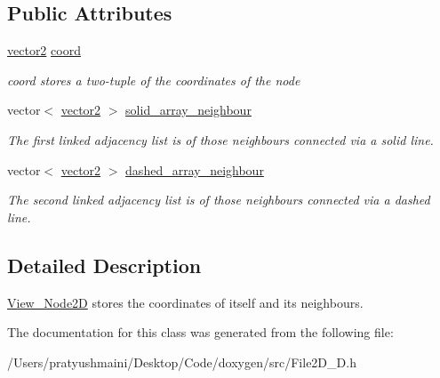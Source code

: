 \subsection*{Public Attributes}
\begin{DoxyCompactItemize}
\item 
\mbox{\label{class_view___node2_d_ac09ef534cd026bc7b0964b3d46674bed}} 
\mbox{\hyperlink{classvector2}{vector2}} \mbox{\hyperlink{class_view___node2_d_ac09ef534cd026bc7b0964b3d46674bed}{coord}}
\begin{DoxyCompactList}\small\item\em coord stores a two-\/tuple of the coordinates of the node \end{DoxyCompactList}\item 
\mbox{\label{class_view___node2_d_abc886abe2f853bd6a62c38a4b385bb4a}} 
vector$<$ \mbox{\hyperlink{classvector2}{vector2}} $>$ \mbox{\hyperlink{class_view___node2_d_abc886abe2f853bd6a62c38a4b385bb4a}{solid\+\_\+array\+\_\+neighbour}}
\begin{DoxyCompactList}\small\item\em The first linked adjacency list is of those neighbours connected via a solid line. \end{DoxyCompactList}\item 
\mbox{\label{class_view___node2_d_aee41cc8b2fbd84a6d54ea5fc55daeac9}} 
vector$<$ \mbox{\hyperlink{classvector2}{vector2}} $>$ \mbox{\hyperlink{class_view___node2_d_aee41cc8b2fbd84a6d54ea5fc55daeac9}{dashed\+\_\+array\+\_\+neighbour}}
\begin{DoxyCompactList}\small\item\em The second linked adjacency list is of those neighbours connected via a dashed line. \end{DoxyCompactList}\end{DoxyCompactItemize}


\subsection{Detailed Description}
\mbox{\hyperlink{class_view___node2_d}{View\+\_\+\+Node2D}} stores the coordinates of itself and its neighbours. 

The documentation for this class was generated from the following file\+:\begin{DoxyCompactItemize}
\item 
/\+Users/pratyushmaini/\+Desktop/\+Code/doxygen/src/File2\+D\+\_\+D.\+h\end{DoxyCompactItemize}
